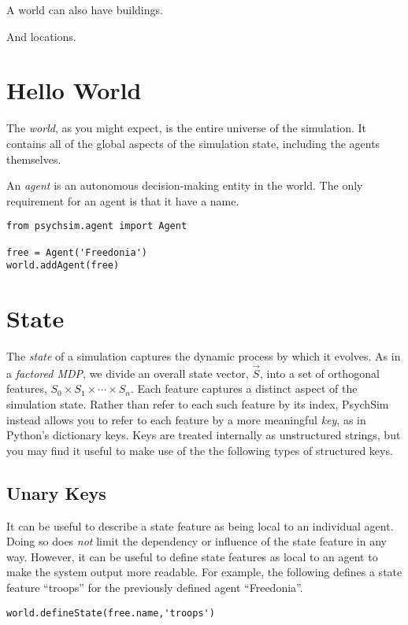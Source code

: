 \documentclass{book}
\begin{document}
A world can also have buildings.

And locations.


\section{Hello World}
The {\em world}, as you might expect, is the entire universe of the simulation. It contains all of the global aspects of the simulation state, including the agents themselves.

An {\em agent} is an autonomous decision-making entity in the world. The only requirement for an agent is that it have a name.

\begin{verbatim}
from psychsim.agent import Agent

free = Agent('Freedonia')
world.addAgent(free)
\end{verbatim}

\section{State}
The {\em state} of a simulation captures the dynamic process by which it evolves. As in a {\em factored MDP}, we divide an overall state vector, $\vec S$, into a set of orthogonal features, $S_0\times S_1\times\cdots\times S_n$. Each feature captures a distinct aspect of the simulation state. Rather than refer to each such feature by its index, PsychSim instead allows you to refer to each feature by a more meaningful {\em key}, as in Python's dictionary keys. Keys are treated internally as unstructured strings, but you may find it useful to make use of the the following types of structured keys.

\subsection{Unary Keys}
It can be useful to describe a state feature as being local to an individual agent. Doing so does {\em not} limit the dependency or influence of the state feature in any way. However, it can be useful to define state features as local to an agent to make the system output more readable. For example, the following defines a state feature ``troops'' for the previously defined agent ``Freedonia''.

\begin{verbatim}
world.defineState(free.name,'troops')
\end{verbatim}
\end{document}
